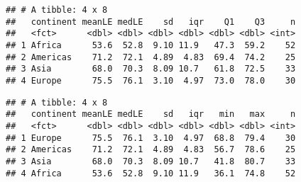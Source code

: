\documentclass[]{book}
\newenvironment{Shaded}{\begin{snugshade}}{\end{snugshade}}
\newcommand{\KeywordTok}[1]{\textcolor[rgb]{0.13,0.29,0.53}{\textbf{#1}}}
\newcommand{\DataTypeTok}[1]{\textcolor[rgb]{0.13,0.29,0.53}{#1}}
\newcommand{\DecValTok}[1]{\textcolor[rgb]{0.00,0.00,0.81}{#1}}
\newcommand{\StringTok}[1]{\textcolor[rgb]{0.31,0.60,0.02}{#1}}
\newcommand{\CommentTok}[1]{\textcolor[rgb]{0.56,0.35,0.01}{\textit{#1}}}
\newcommand{\OtherTok}[1]{\textcolor[rgb]{0.56,0.35,0.01}{#1}}
\newcommand{\OperatorTok}[1]{\textcolor[rgb]{0.81,0.36,0.00}{\textbf{#1}}}
\newcommand{\NormalTok}[1]{#1}
\begin{document}
\begin{verbatim}
## # A tibble: 4 x 8
##   continent meanLE medLE    sd   iqr    Q1    Q3     n
##   <fct>      <dbl> <dbl> <dbl> <dbl> <dbl> <dbl> <int>
## 1 Africa      53.6  52.8  9.10 11.9   47.3  59.2    52
## 2 Americas    71.2  72.1  4.89  4.83  69.4  74.2    25
## 3 Asia        68.0  70.3  8.09 10.7   61.8  72.5    33
## 4 Europe      75.5  76.1  3.10  4.97  73.0  78.0    30
\end{verbatim}

\begin{Shaded}
\end{Shaded}

\begin{verbatim}
## # A tibble: 4 x 8
##   continent meanLE medLE    sd   iqr   min   max     n
##   <fct>      <dbl> <dbl> <dbl> <dbl> <dbl> <dbl> <int>
## 1 Europe      75.5  76.1  3.10  4.97  68.8  79.4    30
## 2 Americas    71.2  72.1  4.89  4.83  56.7  78.6    25
## 3 Asia        68.0  70.3  8.09 10.7   41.8  80.7    33
## 4 Africa      53.6  52.8  9.10 11.9   36.1  74.8    52
\end{verbatim}
\end{document}
